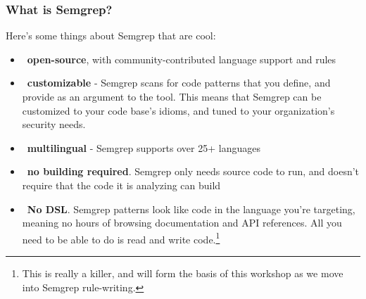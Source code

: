 \documentclass[aspectratio=169, handout]{beamer}
\begin{document}

\begin{frame}[fragile]
  \frametitle{What is Semgrep?}

  Here's some things about Semgrep that are cool:
  \begin{itemize}
    \item {\color{auxColor}\faBookOpen} \, \textbf{open-source}, with community-contributed language support and rules
    \item {\color{auxColor}\faPen} \, \textbf{customizable} - Semgrep scans for code patterns that you define, and provide
    as an argument to the tool. This means that Semgrep can be customized to your code
    base's idioms, and tuned to your organization's security needs.
    \item {\color{auxColor}\faFont} \, \textbf{multilingual} - Semgrep supports over 25+ languages
    \item {\color{auxColor}\faTimes} \, \textbf{no building required}. Semgrep only needs source code to run, and doesn't
    require that the code it is analyzing can build
    \item {\color{auxColor}\faLightbulb} \, \textbf{No DSL}. Semgrep patterns look like code in the language you're targeting,
    meaning no hours of browsing documentation and API references. All you need to be able
    to do is read and write code.\footnote{This is really a killer, and will form the basis
    of this workshop as we move into Semgrep rule-writing.}
  \end{itemize}
\end{frame}
\end{document}
